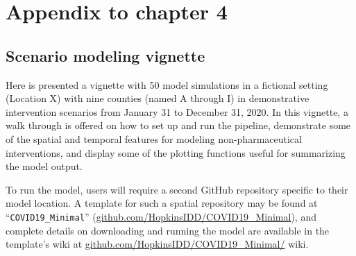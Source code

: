 %
%
%
%


\chapter{Appendix to chapter 4}

\section{Scenario modeling vignette}
Here is presented a vignette with 50 model simulations in a fictional setting (Location X) with nine counties (named A through I) in demonstrative intervention scenarios from January 31 to December 31, 2020. In this vignette, a walk through is offered on how to set up and run the pipeline, demonstrate some of the spatial and temporal features for modeling non-pharmaceutical interventions, and display some of the plotting functions useful for summarizing the model output.

To run the model, users will require a second GitHub repository specific to their model location. A template for such a spatial repository may be found at “\verb|COVID19_Minimal|” (\url{github.com/HopkinsIDD/COVID19_Minimal}), and complete details on downloading and running the model are available in the template’s wiki at \url{github.com/HopkinsIDD/COVID19_Minimal/} wiki.

